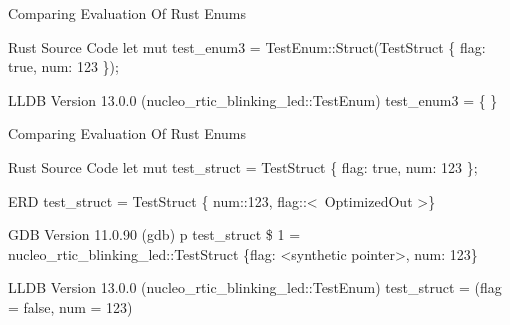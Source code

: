 \begin{frame}{Comparing Evaluation Of Rust Enums}
	
	\begin{alertblock}{Rust Source Code}
		let mut test\_enum3 = TestEnum::Struct(TestStruct \{ flag: true, num: 123 \});
    	\end{alertblock}

    	\begin{block}{LLDB Version 13.0.0}
		(nucleo\_rtic\_blinking\_led::TestEnum) test\_enum3 = \{\newline
		\newline
		\newline
		\newline
		\newline
		\text{\ \ \}}\newline
		\newline
		\newline
		\}
    	\end{block}

\end{frame}


\begin{frame}{Comparing Evaluation Of Rust Enums}
	\begin{alertblock}{Rust Source Code}
		let mut test\_struct = TestStruct \{ flag: true, num: 123 \};
    	\end{alertblock}

	\begin{block}{ERD}
		test\_struct = TestStruct \{ num::123, flag::\textless \ OptimizedOut \textgreater \}
    	\end{block}

    	\begin{block}{GDB Version 11.0.90}
		(gdb) p test\_struct\newline
		\$ 1 = nucleo\_rtic\_blinking\_led::TestStruct \{flag: \textless synthetic pointer\textgreater, num: 123\}
    	\end{block}

    	\begin{block}{LLDB Version 13.0.0}
		(nucleo\_rtic\_blinking\_led::TestEnum) test\_struct = (flag = false, num = 123)
    	\end{block}
\end{frame}

